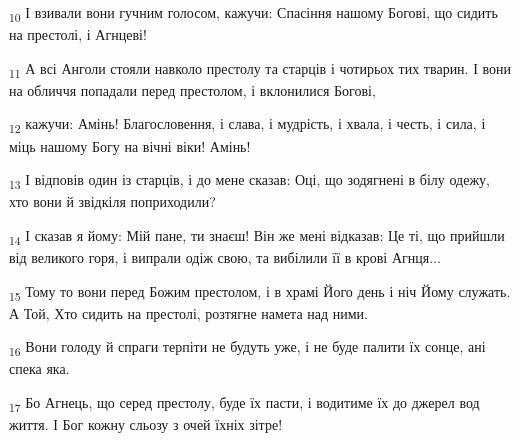 \begin{tcolorbox}
\textsubscript{10} І взивали вони гучним голосом, кажучи: Спасіння нашому Богові, що сидить на престолі, і Агнцеві!
\end{tcolorbox}
\begin{tcolorbox}
\textsubscript{11} А всі Анголи стояли навколо престолу та старців і чотирьох тих тварин. І вони на обличчя попадали перед престолом, і вклонилися Богові,
\end{tcolorbox}
\begin{tcolorbox}
\textsubscript{12} кажучи: Амінь! Благословення, і слава, і мудрість, і хвала, і честь, і сила, і міць нашому Богу на вічні віки! Амінь!
\end{tcolorbox}
\begin{tcolorbox}
\textsubscript{13} І відповів один із старців, і до мене сказав: Оці, що зодягнені в білу одежу, хто вони й звідкіля поприходили?
\end{tcolorbox}
\begin{tcolorbox}
\textsubscript{14} І сказав я йому: Мій пане, ти знаєш! Він же мені відказав: Це ті, що прийшли від великого горя, і випрали одіж свою, та вибілили її в крові Агнця...
\end{tcolorbox}
\begin{tcolorbox}
\textsubscript{15} Тому то вони перед Божим престолом, і в храмі Його день і ніч Йому служать. А Той, Хто сидить на престолі, розтягне намета над ними.
\end{tcolorbox}
\begin{tcolorbox}
\textsubscript{16} Вони голоду й спраги терпіти не будуть уже, і не буде палити їх сонце, ані спека яка.
\end{tcolorbox}
\begin{tcolorbox}
\textsubscript{17} Бо Агнець, що серед престолу, буде їх пасти, і водитиме їх до джерел вод життя. І Бог кожну сльозу з очей їхніх зітре!
\end{tcolorbox}
